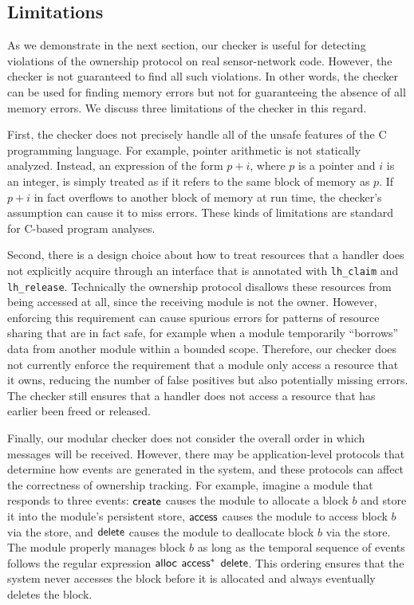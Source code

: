 \subsection{Limitations}

As we demonstrate in the next section, our checker is useful for
detecting violations of the ownership protocol on real sensor-network
code.  However, the checker is not guaranteed to find all such
violations.  In other words, the checker can be used for finding
memory errors but not for guaranteeing the absence of all memory
errors.  We discuss three limitations of the checker in this regard.

First, the checker does not precisely handle all of the unsafe
features of the C programming language.  For example, pointer
arithmetic is not statically analyzed.  Instead, an expression of the
form $p+i$, where $p$ is a pointer and $i$ is an integer, is simply
treated as if it refers to the same block of memory as $p$.  If $p+i$
in fact overflows to another block of memory at run time, the
checker's assumption can cause it to miss errors.  These kinds of
limitations are standard for C-based program analyses.

Second, there is a design choice about how to treat resources that a
handler does not explicitly acquire through an interface that is
annotated with {\tt lh\_claim} and {\tt lh\_release}.  Technically the
ownership protocol disallows these resources from being accessed at
all, since the receiving module is not the owner.  However, enforcing
this requirement can cause spurious errors for patterns of resource
sharing that are in fact safe, for example when a module temporarily
``borrows'' data from another module within a bounded scope.
Therefore, our checker does not currently enforce the requirement that
a module only access a resource that it owns, reducing the number of
false positives but also potentially missing errors.  The checker
still ensures that a handler does not access a resource that has
earlier been freed or released.

Finally, our modular checker does not consider the overall order in
which messages will be received.  However, there may be
application-level protocols that determine how events are generated in
the system, and these protocols can affect the correctness of
ownership tracking.
%
For example, imagine a module that responds to three events: ${\mathsf{create}}$
causes the module to allocate a block $b$ and store it into the
module's persistent store, ${\mathsf{access}}$ causes the module to access block
$b$ via the  store, and ${\mathsf{delete}}$ causes the module to deallocate
block $b$ via the store.  The module properly manages block $b$ as
long as the temporal sequence of events follows the regular expression
${\mathsf{alloc}}$ ${\mathsf{access}}^*$ ${\mathsf{delete}}$.  This ordering ensures that the system
never accesses the block before it is allocated and always eventually
deletes the block.

